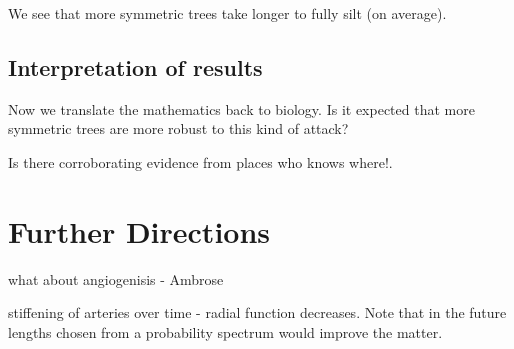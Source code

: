 \documentclass[12pt]{article} %
\theoremstyle{definition}
\begin{document}
We see that more symmetric trees take longer to fully silt (on average).  
\subsection{Interpretation of results}

Now we translate the mathematics back to biology.  Is it expected that more symmetric trees are more 
robust to this kind of attack?

Is there corroborating evidence from places who knows where!.

\section{Further Directions}
what about angiogenisis  - Ambrose


stiffening of arteries over time  - radial function decreases.
Note that in the future lengths chosen from a probability spectrum would improve the matter.   




\end{document}
